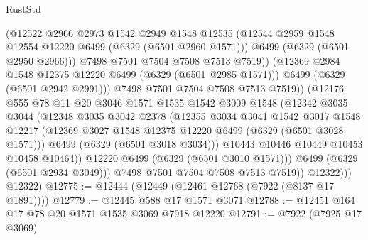 \begin{lexlean}{RustStd}
\begin{coremodule}
{{                            (@12522
                              @2966
                              @2973
                              @1542
                              @2949
                              @1548
                              @12535
                              (@12544 @2959 @1548 @12554 @12220 @6499 (@6329 (@6501 @2960 @1571)))
                              @6499
                              (@6329 (@6501 @2950 @2966)))
                            @7498
                            @7501
                            @7504
                            @7508
                            @7513
                            @7519))
                        (@12369 @2984 @1548 @12375 @12220 @6499 (@6329 (@6501 @2985 @1571)))
                        @6499
                        (@6329 (@6501 @2942 @2991)))
                      @7498
                      @7501
                      @7504
                      @7508
                      @7513
                      @7519))
                  (@12176
                    @555
                    @78
                    @11
                    @20
                    @3046
                    @1571
                    @1535
                    @1542
                    @3009
                    @1548
                    (@12342
                      @3035
                      @3044
                      (@12348
                        @3035
                        @3042
                        @2378
                        (@12355
                          @3034
                          @3041
                          @1542
                          @3017
                          @1548
                          @12217
                          (@12369 @3027 @1548 @12375 @12220 @6499 (@6329 (@6501 @3028 @1571)))
                          @6499
                          (@6329 (@6501 @3018 @3034)))
                        @10443
                        @10446
                        @10449
                        @10453
                        @10458
                        @10464))
                    @12220
                    @6499
                    (@6329 (@6501 @3010 @1571)))
                  @6499
                  (@6329 (@6501 @2934 @3049)))
                @7498
                @7501
                @7504
                @7508
                @7513
                @7519))
            @12322)))
      @12322)
@12775 := @12444 (@12449 (@12461 @12768 (@7922 (@8137 @17 @1891))))
@12779 := @12445 @588 @17 @1571 @3071
@12788 := @12451 @164 @17 @78 @20 @1571 @1535 @3069 @7918 @12220
@12791 := @7922 (@7925 @17 @3069)
}}
\end{coremodule}
\end{lexlean}

